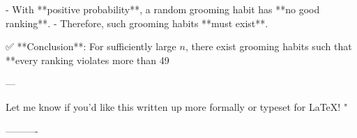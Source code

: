 \begin{enumerate}
\begin{shaded}
- With **positive probability**, a random grooming habit has **no good ranking**.
- Therefore, such grooming habits **must exist**.

✅ **Conclusion**: For sufficiently large \(n\), there exist grooming habits such that **every ranking violates more than 49%

---

Let me know if you'd like this written up more formally or typeset for LaTeX!
"

\fi
\end{shaded}
\fi

\end{enumerate}


----------

\documentclass[11pt]{article}
%
\def\template{1}
%
\usepackage{fullpage,graphicx}
\usepackage{amsmath,amsfonts,amsthm,amssymb,multirow}
\usepackage{algorithmic,comment,url,enumerate}
\usepackage{tikz}
\usepackage{framed}
\usetikzlibrary{decorations.pathreplacing, shapes}
\usepackage[ruled,vlined,commentsnumbered,titlenotnumbered]{algorithm2e}
\newcommand{\expecting}[1]{\noindent{[\textbf{We are expecting:} \em #1\em]}}
\newcommand{\hint}[1]{\noindent{[\textbf{HINT:} \em #1 \em]}}
\newcommand{\pts}[1]{\textbf{(#1 pt.)}}
\newcommand{\sgn}{\mathrm{sgn}}
\newcommand{\Ex}[1]{\operatorname*{\mathbb{E}}\left[#1\right]}



\noindent
\textbf{Problem Set 5 \ifdefined\sol Solution \fi} \hfill CS265/CME309, Winter 2025
\ifdefined\sol\else
\newline
Due: Friday 2/28, 11:59pm on Gradescope
\ifdefined\template
\newline 
Group members: INSERT NAMES HERE
\fi

\vspace{.4cm}\noindent
Please follow the homework policies on the course website.
\fi

\noindent
\rule{\linewidth}{0.4pt}

